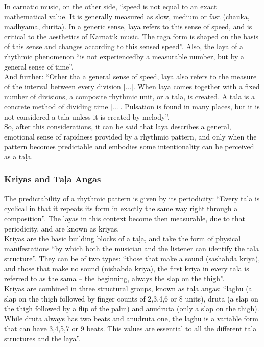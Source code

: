 In carnatic music, on the other side, ``speed is not equal to an exact mathematical value. It is generally measured as slow, medium or fast (chauka, madhyama, durita). In a generic sense, laya refers to this sense of speed, and is critical to the aesthetics of Karnatik music. The raga form is shaped on the basis of this sense and changes according to this sensed speed''\cite[p.61]{krishna}. Also, the laya of a rhythmic phenomenon ``is not experiencedby a measurable number, but by a general sense of time''\cite[p.61]{krishna}.\\

And further: ``Other tha a general sense of speed, laya also refers to the measure of the interval between every division [...]. When laya comes together with a fixed number of divisions, a composite rhythmic unit, or a tala, is created. A tala is a concrete method of dividing time [...]. Pulsation is found in many places, but it is not considered a tala unless it is created by melody''\cite[p.63]{krishna}.\\

So, after this considerations, it can be said that laya describes a general, emotional sense of rapidness provided by a rhythmic pattern, and only when the pattern becomes predictable and embodies some intentionality can be perceived as a t\=a\d{l}a.

\subsubsection{Kriyas and T\=a\d{l}a Angas}

The predictability of a rhythmic pattern is given by its periodicity: ``Every tala is cyclical in that it repeats its form in exactly the same way right through a composition''\cite[p.63]{krishna}. The layas in this context become then measurable, due to that periodicity, and are known as kriyas.\\

Kriyas are the basic building blocks of a t\=a\d{l}a, and take the form of physical manifestations ``by which both the musician and the listener can identify the tala structure''\cite[p.63]{krishna}. They can be of two types: ``those that make a sound (sashabda kriya), and those that make no sound (nishabda kriya), the first kriya in every tala is referred to as the sama -- the beginning, always the slap on the thigh''\cite[p.64]{krishna}.\\

Kriyas are combined in three structural groups, known as t\=a\d{l}a angas: ``laghu (a slap on the thigh followed by finger counts of 2,3,4,6 or 8 units), druta (a slap on the thigh followed by a flip of the palm) and anudruta (only a slap on the thigh). While druta always has two beats and anudruta one, the laghu is a variable form that can have 3,4,5,7 or 9 beats. This values are essential to all the different tala structures and the laya''\cite[p.64]{krishna}.\\

